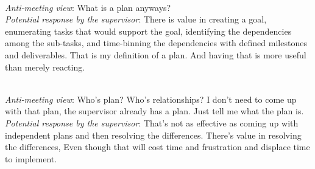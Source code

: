 \ \\

\textit{Anti-meeting view}: What is a plan anyways?\\
\textit{Potential response by the supervisor}: There is value in creating a goal, enumerating tasks that would support the goal, identifying the dependencies among the sub-tasks, and time-binning the dependencies with defined milestones and deliverables. That is my definition of a plan. And having that is more useful than merely reacting.

\ \\

\textit{Anti-meeting view}: Who's plan? Who's relationships? I don't need to come up with that plan, the supervisor already has a plan. Just tell me what the plan is.\\
\textit{Potential response by the supervisor}: That's not as effective as coming up with independent plans and then resolving the differences. There's value in resolving the differences, Even though that will cost time and frustration and displace time to implement.

